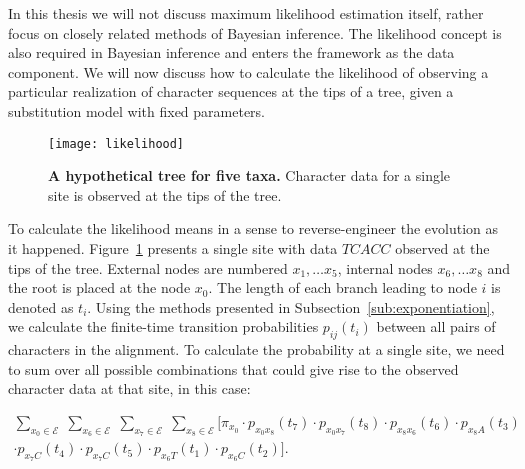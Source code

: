 In this thesis we will not discuss maximum likelihood estimation itself, %
rather focus on closely related 
methods of Bayesian inference.
The likelihood concept is also required in Bayesian inference and enters the framework as the data component.
We will now discuss how to calculate the likelihood of observing a particular realization of character sequences at the tips of a tree, given a substitution model with fixed parameters.

\begin{figure}[H]
\centering
\texttt{[image: likelihood]} 
\caption{
{ \footnotesize 
{\bf  A hypothetical tree for five taxa.} Character data for a single site is observed at the tips of the tree.
} %
}
\label{fig:LIKELIHOOD}
\end{figure}

To calculate the likelihood means in a sense to reverse-engineer the evolution as it happened.
Figure~\ref{fig:LIKELIHOOD} presents a single site with data $TCACC$ observed at the tips of the tree.
External nodes are numbered $x_{1}, \ldots x_{5}$, internal nodes $x_{6}, \ldots x_{8}$ and the root is placed at the node $x_{0}$.
The length of each branch leading to node $i$ is denoted as $t_{i}$. 
Using the methods presented in Subsection~\ref{sub:exponentiation}, we calculate the finite-time transition probabilities $p_{ij}(t_{i})$ between all pairs of characters in the alignment.
To calculate the probability at a single site, we need to sum over all possible combinations that could give rise to the observed character data at that site, in this case:

\begin{align}
\underset{x_{0}\in \mathcal{E}}{\sum}\;\underset{x_{6}\in \mathcal{E}}{\sum}\;\underset{x_{7}\in \mathcal{E}}{\sum}\;\underset{x_{8}\in \mathcal{E}}{\sum}[\pi_{x_{0}}\cdot p_{x_{0}x_{8}}(t_{7})\cdot p_{x_{0}x_{7}}(t_{8})\cdot p_{x_{8}x_{6}}(t_{6})\cdot p_{x_{8}A}(t_{3}) \nonumber \\
\cdot p_{x_{7}C}(t_{4})\cdot p_{x_{7}C}(t_{5})\cdot p_{x_{6}T}(t_{1})\cdot p_{x_{6}C}(t_{2})].
\label{eq:likelihoodNaive}
\end{align}

